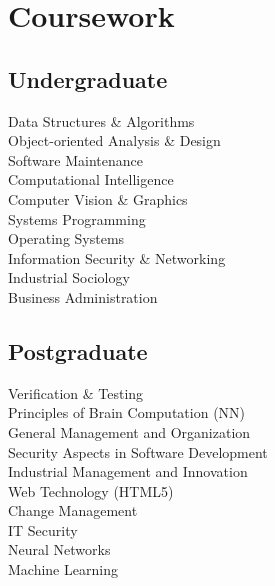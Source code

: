 \documentclass[]{resume}
\begin{document}


\vfill
\begin{minipage}[t]{0.33\textwidth} 
\section{Coursework}
	\subsection{Undergraduate}
		Data Structures \& Algorithms \\
		Object-oriented Analysis \& Design \\
		Software Maintenance \\
		Computational Intelligence\\
		Computer Vision \& Graphics \\
		Systems Programming \\
		Operating Systems \\
		Information Security \& Networking \\
		Industrial Sociology \\
		Business Administration
		\sectionsep
	
	\subsection{Postgraduate}
		Verification \& Testing \\
		Principles of Brain Computation (NN) \\
		General Management and Organization \\
		Security Aspects in Software Development \\
		Industrial Management and Innovation \\
		Web Technology (HTML5) \\
		Change Management \\
		IT Security \\
		Neural Networks \\
		Machine Learning 
		\sectionsep	


\end{minipage}
\end{document}
